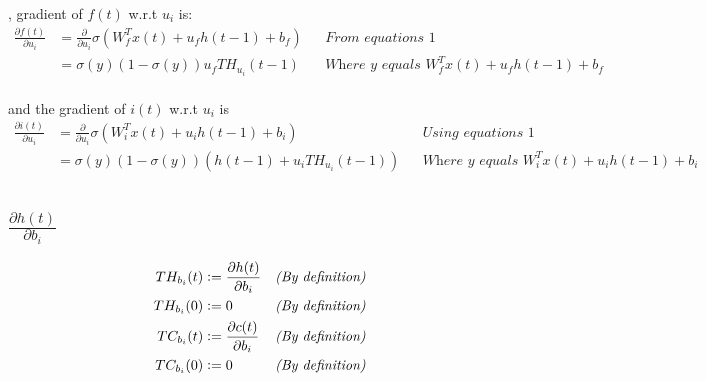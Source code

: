 \documentclass{article}
\begin{document}
, gradient of $f(t)$  w.r.t $u_i$ is:
\begin{align*}
\frac{\partial f(t)}{\partial u_i} &=  \frac{\partial}{\partial u_i} \sigma(W_{f}^T x(t) + u_{f} h(t-1) + b_f) && \textit{From equations 1} \\
&= \sigma(y)(1-\sigma(y))u_f TH_{u_i}(t-1) && \textit{Where $y$ equals $W_{f}^T x(t) + u_{f} h(t-1) + b_f$} \\
\end{align*}

and the gradient of $i(t)$  w.r.t $u_i$ is
\begin{align*}
\frac{\partial i(t)}{\partial u_i} &=  \frac{\partial}{\partial u_i} \sigma(W_{i}^T x(t) + u_{i} h(t-1) + b_i) && \textit{Using equations 1} \\
&= \sigma(y)(1-\sigma(y)) \left (h(t-1)+ u_i TH_{u_{i}}(t-1) \right )&& \textit{Where $y$ equals $W_{i}^T x(t) + u_{i} h(t-1) + b_i$} \\
\end{align*}

\subsection{$\frac{\partial h(t)}{\partial b_i}$}

\begin{align}
TH_{b_i}(t)  & \vcentcolon = \frac{\partial h(t)}{\partial b_i}  && \textit{(By definition)}  \label{thb}\\
TH_{b_i}(0)  & \vcentcolon = 0  && \textit{(By definition)}  \\
TC_{b_i}(t)  & \vcentcolon = \frac{\partial c(t)}{\partial b_i}  && \textit{(By definition)}  \label{tcb}\\
TC_{b_i}(0)  & \vcentcolon = 0  && \textit{(By definition)} 
\end{align}
\end{document}
